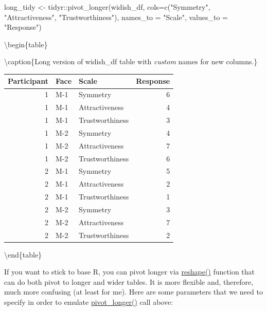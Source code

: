\documentclass[
]{book}
\newenvironment{Shaded}{\begin{snugshade}}{\end{snugshade}}
\newcommand{\AttributeTok}[1]{\textcolor[rgb]{0.77,0.63,0.00}{#1}}
\newcommand{\FunctionTok}[1]{\textcolor[rgb]{0.00,0.00,0.00}{#1}}
\newcommand{\NormalTok}[1]{#1}
\newcommand{\OtherTok}[1]{\textcolor[rgb]{0.56,0.35,0.01}{#1}}
\newcommand{\SpecialCharTok}[1]{\textcolor[rgb]{0.00,0.00,0.00}{#1}}
\newcommand{\StringTok}[1]{\textcolor[rgb]{0.31,0.60,0.02}{#1}}
\begin{document}
\begin{Shaded}
\begin{Highlighting}[]
\NormalTok{long\_tidy }\OtherTok{\textless{}{-}}\NormalTok{ tidyr}\SpecialCharTok{::}\FunctionTok{pivot\_longer}\NormalTok{(widish\_df, }
                               \AttributeTok{cols=}\FunctionTok{c}\NormalTok{(}\StringTok{"Symmetry"}\NormalTok{, }\StringTok{"Attractiveness"}\NormalTok{, }\StringTok{"Trustworthiness"}\NormalTok{),}
                               \AttributeTok{names\_to =} \StringTok{"Scale"}\NormalTok{,}
                               \AttributeTok{values\_to =} \StringTok{"Response"}\NormalTok{)}
\end{Highlighting}
\end{Shaded}

\textbackslash begin\{table\}

\textbackslash caption\{\label{tab:unnamed-chunk-202}Long version of widish\_df table with \emph{custom} names for new columns.\}
\centering

\begin{tabular}[t]{r|l|l|r}
\hline
Participant & Face & Scale & Response\\
\hline
1 & M-1 & Symmetry & 6\\
\hline
1 & M-1 & Attractiveness & 4\\
\hline
1 & M-1 & Trustworthiness & 3\\
\hline
1 & M-2 & Symmetry & 4\\
\hline
1 & M-2 & Attractiveness & 7\\
\hline
1 & M-2 & Trustworthiness & 6\\
\hline
2 & M-1 & Symmetry & 5\\
\hline
2 & M-1 & Attractiveness & 2\\
\hline
2 & M-1 & Trustworthiness & 1\\
\hline
2 & M-2 & Symmetry & 3\\
\hline
2 & M-2 & Attractiveness & 7\\
\hline
2 & M-2 & Trustworthiness & 2\\
\hline
\end{tabular}

\textbackslash end\{table\}

If you want to stick to base R, you can pivot longer via \href{https://stat.ethz.ch/R-manual/R-patched/library/stats/html/reshape.html}{reshape()} function that can do both pivot to longer and wider tables. It is more flexible and, therefore, much more confusing (at least for me). Here are some parameters that we need to specify in order to emulate \href{https://tidyr.tidyverse.org/reference/pivot_longer.html}{pivot\_longer()} call above:
\end{document}
